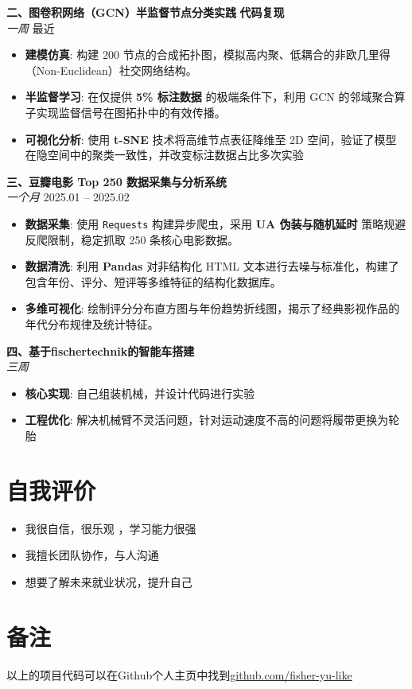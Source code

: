 \documentclass[11pt,a4paper]{article}
\begin{document}
\textbf{二、图卷积网络（GCN）半监督节点分类实践} \hfill \textbf{代码复现}\\
\textit{一周} \hfill 最近
\begin{itemize}[leftmargin=1.5em, itemsep=2pt]
    \item \textbf{建模仿真}: 构建 200 节点的合成拓扑图，模拟高内聚、低耦合的非欧几里得（Non-Euclidean）社交网络结构。
    \item \textbf{半监督学习}: 在仅提供 \textbf{5\% 标注数据} 的极端条件下，利用 GCN 的邻域聚合算子实现监督信号在图拓扑中的有效传播。
    \item \textbf{可视化分析}: 使用 \textbf{t-SNE} 技术将高维节点表征降维至 2D 空间，验证了模型在隐空间中的聚类一致性，并改变标注数据占比多次实验
\end{itemize}

\textbf{三、豆瓣电影 Top 250 数据采集与分析系统} \hfill  \\
\textit{一个月} \hfill 2025.01 -- 2025.02
\begin{itemize}[leftmargin=1.5em, itemsep=2pt]
    \item \textbf{数据采集}: 使用 \texttt{Requests} 构建异步爬虫，采用 \textbf{UA 伪装与随机延时} 策略规避反爬限制，稳定抓取 250 条核心电影数据。
    \item \textbf{数据清洗}: 利用 \textbf{Pandas} 对非结构化 HTML 文本进行去噪与标准化，构建了包含年份、评分、短评等多维特征的结构化数据库。
    \item \textbf{多维可视化}: 绘制评分分布直方图与年份趋势折线图，揭示了经典影视作品的年代分布规律及统计特征。
\end{itemize}

\textbf{四、基于fischertechnik的智能车搭建} \hfill  \\
\textit{三周} \hfill 
\begin{itemize}[leftmargin=1.5em, itemsep=2pt]
    \item \textbf{核心实现}: 自己组装机械，并设计代码进行实验
    \item \textbf{工程优化}: 解决机械臂不灵活问题，针对运动速度不高的问题将履带更换为轮胎
\end{itemize}

\section{自我评价}
\begin{itemize}[leftmargin=1.5em, itemsep=0pt]
    \item 我很自信，很乐观 ，学习能力很强
    \item 我擅长团队协作，与人沟通
    \item 想要了解未来就业状况，提升自己
\end{itemize}

\section{备注}
以上的项目代码可以在Github个人主页中找到\href{https://github.com/fisher-yu-like}{github.com/fisher-yu-like}
\end{document}
